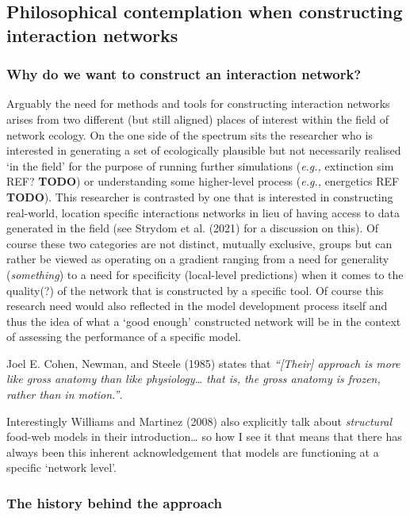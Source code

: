 \documentclass[
  letterpaper,
  DIV=11,
  numbers=noendperiod]{scrartcl}
\begin{document}
\subsection{Philosophical contemplation when constructing interaction
networks}\label{philosophical-contemplation-when-constructing-interaction-networks}

\subsubsection{Why do we want to construct an interaction
network?}\label{why-do-we-want-to-construct-an-interaction-network}

Arguably the need for methods and tools for constructing interaction
networks arises from two different (but still aligned) places of
interest within the field of network ecology. On the one side of the
spectrum sits the researcher who is interested in generating a set of
ecologically plausible but not necessarily realised `in the field' for
the purpose of running further simulations (\emph{e.g.,} extinction sim
REF? \textbf{TODO}) or understanding some higher-level process
(\emph{e.g.,} energetics REF \textbf{TODO}). This researcher is
contrasted by one that is interested in constructing real-world,
location specific interactions networks in lieu of having access to data
generated in the field (see Strydom et al. (2021) for a discussion on
this). Of course these two categories are not distinct, mutually
exclusive, groups but can rather be viewed as operating on a gradient
ranging from a need for generality (\emph{something}) to a need for
specificity (local-level predictions) when it comes to the quality(?) of
the network that is constructed by a specific tool. Of course this
research need would also reflected in the model development process
itself and thus the idea of what a `good enough' constructed network
will be in the context of assessing the performance of a specific model.

Joel E. Cohen, Newman, and Steele (1985) states that \emph{``{[}Their{]}
approach is more like gross anatomy than like physiology\ldots{} that
is, the gross anatomy is frozen, rather than in motion.''}.

Interestingly Williams and Martinez (2008) also explicitly talk about
\emph{structural} food-web models in their introduction\ldots{} so how I
see it that means that there has always been this inherent
acknowledgement that models are functioning at a specific `network
level'.

\subsubsection{The history behind the
approach}\label{the-history-behind-the-approach}
\end{document}
